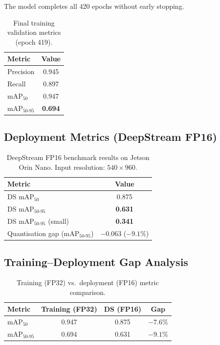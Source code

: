\documentclass[12pt, titlepage]{article}
\begin{document}
The model completes all 420 epochs without early stopping.

\begin{table}[H]
  \centering
  \caption{Final training validation metrics (epoch 419).}
  \label{tab:train_results}
  \begin{tabular}{@{}lc@{}}
    \toprule
    \textbf{Metric}      & \textbf{Value} \\
    \midrule
    Precision            & 0.945          \\
    Recall               & 0.897          \\
    mAP$_{50}$           & 0.947          \\
    mAP$_{50\text{-}95}$ & \textbf{0.694} \\
    \bottomrule
  \end{tabular}
\end{table}

\subsection{Deployment Metrics (DeepStream FP16)}
\label{sec:deploy_results}

\begin{table}[H]
  \centering
  \caption{DeepStream FP16 benchmark results on Jetson Orin Nano.
    Input resolution: $540{\times}960$.}
  \label{tab:deploy_results}
  \begin{tabular}{@{}lc@{}}
    \toprule
    \textbf{Metric}                         & \textbf{Value}      \\
    \midrule
    DS mAP$_{50}$                           & 0.875               \\
    DS mAP$_{50\text{-}95}$                 & \textbf{0.631}      \\
    DS mAP$_{50\text{-}95}$ (small)         & \textbf{0.341}      \\
    \midrule
    Quantisation gap (mAP$_{50\text{-}95}$) & $-0.063$ ($-9.1\%$) \\
    \bottomrule
  \end{tabular}
\end{table}

\subsection{Training--Deployment Gap Analysis}

\begin{table}[H]
  \centering
  \caption{Training (FP32) vs.\ deployment (FP16) metric comparison.}
  \label{tab:gap}
  \begin{tabular}{@{}lccc@{}}
    \toprule
    \textbf{Metric}      & \textbf{Training (FP32)} & \textbf{DS (FP16)} & \textbf{Gap} \\
    \midrule
    mAP$_{50}$           & 0.947                    & 0.875              & $-7.6\%$     \\
    mAP$_{50\text{-}95}$ & 0.694                    & 0.631              & $-9.1\%$     \\
    \bottomrule
  \end{tabular}
\end{table}
\end{document}
